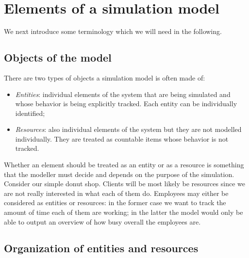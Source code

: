 \documentclass[
]{book}
\begin{document}
\hypertarget{elements-of-a-simulation-model}{%
\section{Elements of a simulation model}\label{elements-of-a-simulation-model}}

We next introduce some terminology which we will need in the following.

\hypertarget{objects-of-the-model}{%
\subsection{Objects of the model}\label{objects-of-the-model}}

There are two types of objects a simulation model is often made of:

\begin{itemize}
\item
  \emph{Entities}: individual elements of the system that are being simulated and whose behavior is being explicitly tracked. Each entity can be individually identified;
\item
  \emph{Resources}: also individual elements of the system but they are not modelled individually. They are treated as countable items whose behavior is not tracked.
\end{itemize}

Whether an element should be treated as an entity or as a resource is something that the modeller must decide and depends on the purpose of the simulation. Consider our simple donut shop. Clients will be most likely be resources since we are not really interested in what each of them do. Employees may either be considered as entities or resources: in the former case we want to track the amount of time each of them are working; in the latter the model would only be able to output an overview of how busy overall the employees are.

\hypertarget{organization-of-entities-and-resources}{%
\subsection{Organization of entities and resources}\label{organization-of-entities-and-resources}}
\end{document}

